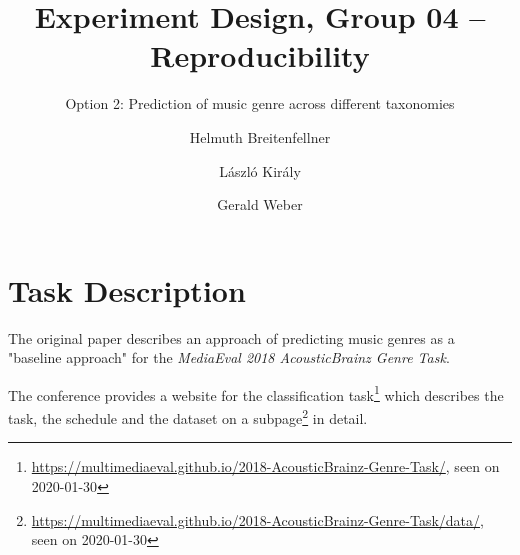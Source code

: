 \documentclass[sigconf,nonacm]{acmart}
\begin{document}
\title{Experiment Design, Group 04 -- Reproducibility}

\subtitle{Option 2: Prediction of music genre across different taxonomies}


\author{Helmuth Breitenfellner}
\affiliation{%
}

\author{L\'aszl\'o Kir\'aly}
\affiliation{%
}

\author{Gerald Weber}
\affiliation{%
}


\maketitle

\section{Task Description}

The original paper describes an approach of predicting music genres
as a "baseline approach" for the
\emph{MediaEval 2018 AcousticBrainz Genre Task}.

The conference provides a website for the classification
task\footnote{\url{https://multimediaeval.github.io/2018-AcousticBrainz-Genre-Task/}, seen on 2020-01-30}
which describes the task, the schedule and the dataset on a
subpage\footnote{\url{https://multimediaeval.github.io/2018-AcousticBrainz-Genre-Task/data/}, seen on 2020-01-30}
in detail.
\end{document}

